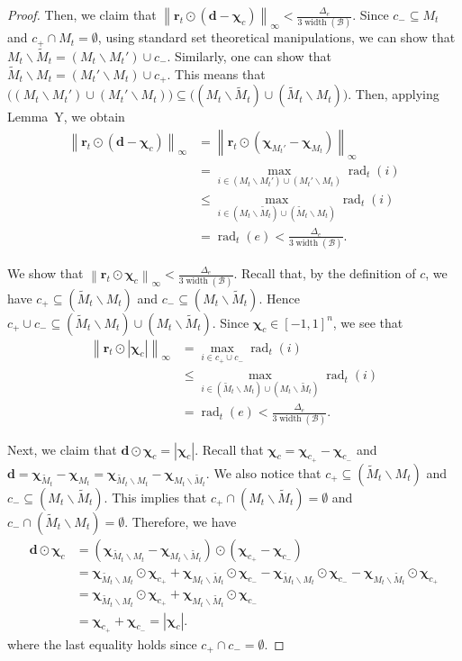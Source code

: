 \documentclass{article}
\newcommand{\B}{\mathcal B}
\newcommand{\del}{\backslash}
\DeclareMathOperator{\rank}{width}
\DeclareMathOperator{\rad}{rad}
\newcommand{\nor}[1]{\left\|#1\right\|}
\renewcommand{\vec}[1]{\boldsymbol{#1}}
\begin{document}
\begin{spacing}{1.1}
\begin{proof}
Then, we claim that $\nor{\vec r_t \odot (\vec d-\vec \chi_c)}_\infty < \frac{\Delta_e}{3\rank(\B)}$.
Since $c_-\subseteq M_t$ and $c_+\cap M_t = \emptyset$, using standard set theoretical manipulations, we can show that $M_t \del \tilde M_t= (M_t \del M_t') \cup c_-$. 
Similarly, one can show that $\tilde M_t \del M_t = (M_t' \del M_t) \cup c_+$. 
This means that $\big((M_t \del M_t') \cup (M_t'\del M_t)\big) \subseteq \big((M_t \del \tilde M_t ) \cup (\tilde M_t \del M_t)\big)$.
Then, applying Lemma~Y, we obtain
\begin{align}
   \nor{\vec r_t \odot (\vec d-\vec\chi_c)}_\infty 
   &= \nor{\vec r_t \odot (\vec \chi_{M_t'} - \vec\chi_{M_t})}_\infty \nonumber\\
   &= \max_{i\in (M_t \del M_t') \cup (M_t'\del M_t) } \rad_t(i) \nonumber \\
   &\le \max_{i\in (M_t \del \tilde M_t ) \cup (\tilde M_t \del M_t)}  \rad_t(i) \nonumber \\
   & = \rad_t(e) < \frac{\Delta_e}{3\rank(\B)} \label{eq:u-c-1-0}.
\end{align}

We show that $\nor{\vec r_t \odot \vec \chi_c}_\infty < \frac{\Delta_e}{3\rank(\B)}$.
Recall that, by the definition of $c$, we have
$c_+\subseteq (\tilde M_t \del M_t)$ and $c_-\subseteq (M_t\del \tilde M_t)$. 
Hence $c_+\cup c_- \subseteq  (\tilde M_t \del M_t)\cup (M_t\del \tilde M_t)$.
Since $\vec \chi_c \in [-1,1]^n$, we see that 
\begin{align}
\nor{\vec r_t \odot |\vec \chi_c|}_\infty &= \max_{i\in  c_+\cup c_-} \rad_t(i) \nonumber \\
									    &\le \max_{i\in  (\tilde M_t \del M_t)\cup (M_t\del \tilde M_t)} \rad_t(i)  \nonumber \\
									    &= \rad_t(e) < \frac{\Delta_e}{3\rank(\B)} \label{eq:u-c-1-0-1}.
\end{align}


Next, we claim that $\vec d \odot \vec \chi_c = |\vec \chi_c|$.
Recall that $\vec\chi_c = \vec\chi_{c_+}-\vec\chi_{c_-}$
and $\vec d = \vec \chi_{\tilde M_t}-\vec \chi_{M_t} = \vec\chi_{\tilde M_t\del M_t} - \vec\chi_{M_t\del \tilde M_t}$.
We also notice that $c_+ \subseteq (\tilde M_t \del M_t)$ and $c_- \subseteq (M_t \del \tilde M_t)$.
This implies that $c_+ \cap (M_t \del \tilde M_t) = \emptyset$ and $c_-\cap (\tilde M_t \del M_t) = \emptyset$.
Therefore, we have
\begin{align*}
\vec d \odot \vec \chi_c &= (\vec\chi_{\tilde M_t\del M_t} - \vec\chi_{M_t\del \tilde M_t})\odot(\vec\chi_{c_+}-\vec\chi_{c_-})\\
&= \vec\chi_{\tilde M_t\del M_t}\odot \vec\chi_{c_+}+
   \vec\chi_{M_t \del \tilde M_t}\odot \vec\chi_{c_-}-
   \vec\chi_{\tilde M_t\del M_t}\odot \vec\chi_{c_-}-
   \vec\chi_{M_t\del \tilde M_t}\odot \vec\chi_{c_+}\\
&= \vec\chi_{\tilde M_t\del M_t}\odot \vec\chi_{c_+}+
   \vec\chi_{M_t \del \tilde M_t}\odot \vec\chi_{c_-} \\
&= \vec\chi_{c_+}+\vec\chi_{c_-} =|\vec\chi_c|. 
\end{align*}
where the last equality holds since $c_+\cap c_- =\emptyset$.


\end{proof}
\end{spacing}
\end{document}
